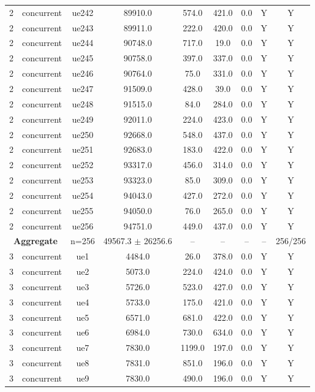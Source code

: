 \begin{table}[ht]
\begin{tabular}{|c|c|c|c|c|c|c|c|c|}
2 & concurrent & ue242 & 89910.0 & 574.0 & 421.0 & 0.0 & Y & Y \\
2 & concurrent & ue243 & 89911.0 & 222.0 & 420.0 & 0.0 & Y & Y \\
2 & concurrent & ue244 & 90748.0 & 717.0 & 19.0 & 0.0 & Y & Y \\
2 & concurrent & ue245 & 90758.0 & 397.0 & 337.0 & 0.0 & Y & Y \\
2 & concurrent & ue246 & 90764.0 & 75.0 & 331.0 & 0.0 & Y & Y \\
2 & concurrent & ue247 & 91509.0 & 428.0 & 39.0 & 0.0 & Y & Y \\
2 & concurrent & ue248 & 91515.0 & 84.0 & 284.0 & 0.0 & Y & Y \\
2 & concurrent & ue249 & 92011.0 & 224.0 & 423.0 & 0.0 & Y & Y \\
2 & concurrent & ue250 & 92668.0 & 548.0 & 437.0 & 0.0 & Y & Y \\
2 & concurrent & ue251 & 92683.0 & 183.0 & 422.0 & 0.0 & Y & Y \\
2 & concurrent & ue252 & 93317.0 & 456.0 & 314.0 & 0.0 & Y & Y \\
2 & concurrent & ue253 & 93323.0 & 85.0 & 309.0 & 0.0 & Y & Y \\
2 & concurrent & ue254 & 94043.0 & 427.0 & 272.0 & 0.0 & Y & Y \\
2 & concurrent & ue255 & 94050.0 & 76.0 & 265.0 & 0.0 & Y & Y \\
2 & concurrent & ue256 & 94751.0 & 449.0 & 437.0 & 0.0 & Y & Y \\
\multicolumn{2}{|c|}{\textbf{Aggregate}} & n=256 & 49567.3 $\pm$ 26256.6 & -- & -- & -- & -- & 256/256 \\
\hline
3 & concurrent & ue1 & 4484.0 & 26.0 & 378.0 & 0.0 & Y & Y \\
3 & concurrent & ue2 & 5073.0 & 224.0 & 424.0 & 0.0 & Y & Y \\
3 & concurrent & ue3 & 5726.0 & 523.0 & 427.0 & 0.0 & Y & Y \\
3 & concurrent & ue4 & 5733.0 & 175.0 & 421.0 & 0.0 & Y & Y \\
3 & concurrent & ue5 & 6571.0 & 681.0 & 422.0 & 0.0 & Y & Y \\
3 & concurrent & ue6 & 6984.0 & 730.0 & 634.0 & 0.0 & Y & Y \\
3 & concurrent & ue7 & 7830.0 & 1199.0 & 197.0 & 0.0 & Y & Y \\
3 & concurrent & ue8 & 7831.0 & 851.0 & 196.0 & 0.0 & Y & Y \\
3 & concurrent & ue9 & 7830.0 & 490.0 & 196.0 & 0.0 & Y & Y \\

\end{tabular}
\end{table}
